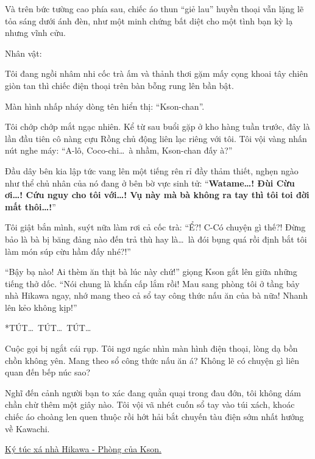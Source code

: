 \documentclass[../main.tex]{subfiles}
\begin{document}
Và trên bức tường cao phía sau, chiếc áo thun ``giẻ lau'' huyền thoại vẫn lặng lẽ tỏa sáng dưới ánh đèn, như một minh chứng bất diệt cho một tình bạn kỳ lạ nhưng vĩnh cửu.

\newpage

\begin{center}
  {\caviar\fontsize{12pt}{12pt}\selectfont Nhân vật:  }
\end{center}


Tôi đang ngồi nhâm nhi cốc trà ấm và thảnh thơi gặm mấy cọng khoai tây chiên giòn tan thì chiếc điện thoại trên bàn bỗng rung lên bần bật.

Màn hình nhấp nháy dòng tên hiển thị: ``Kson-chan''.

Tôi chớp chớp mắt ngạc nhiên. Kể từ sau buổi gặp ở kho hàng tuần trước, đây là lần đầu tiên cô nàng cựu Rồng chủ động liên lạc riêng với tôi. Tôi vội vàng nhấn nút nghe máy: ``A-lô, Coco-chi\dots\ à nhầm, Kson-chan đấy à?''

Đầu dây bên kia lập tức vang lên một tiếng rên rỉ đầy thảm thiết, nghẹn ngào như thể chủ nhân của nó đang ở bên bờ vực sinh tử: ``\textbf{Watame\dots! Đùi Cừu ơi\dots! Cứu nguy cho tôi với\dots! Vụ này mà bà không ra tay thì tôi toi đời mất thôi\dots!}''

Tôi giật bắn mình, suýt nữa làm rơi cả cốc trà: ``Ể?! C-Có chuyện gì thế?! Đừng bảo là bà bị băng đảng nào đến trả thù hay là\dots\ là đói bụng quá rồi định bắt tôi làm món súp cừu hầm đấy nhé?!''

``Bậy bạ nào! Ai thèm ăn thịt bà lúc này chứ!'' giọng Kson gắt lên giữa những tiếng thở dốc. ``Nói chung là khẩn cấp lắm rồi! Mau sang phòng tôi ở tầng bảy nhà Hikawa ngay, nhớ mang theo cả sổ tay công thức nấu ăn của bà nữa! Nhanh lên kẻo không kịp!''

*TÚT\dots\ TÚT\dots\ TÚT\dots*

Cuộc gọi bị ngắt cái rụp. Tôi ngơ ngác nhìn màn hình điện thoại, lòng dạ bồn chồn không yên. Mang theo sổ công thức nấu ăn á? Không lẽ có chuyện gì liên quan đến bếp núc sao?

Nghĩ đến cảnh người bạn to xác đang quằn quại trong đau đớn, tôi không dám chần chừ thêm một giây nào. Tôi vội vã nhét cuốn sổ tay vào túi xách, khoác chiếc áo choàng len quen thuộc rồi hớt hải bắt chuyến tàu điện sớm nhất hướng về Kawachi.

\ct

\begin{center}
  \uline{Ký túc xá nhà Hikawa - Phòng của Kson.}
\end{center}
\end{document}
